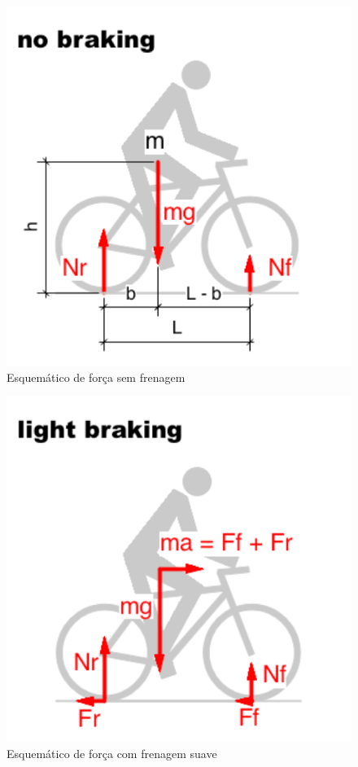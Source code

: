 		\graphicspath{{figuras/}}
		\begin{figure}[H]
		\centering
		\includegraphics[scale=0.80]{esq_forca_sem_frenagem.png}
		\caption{Esquemático de força sem frenagem}
		\label{img:esq_forca_sem_frenagem}
		\end{figure}

		\graphicspath{{figuras/}}
		\begin{figure}[h!]
		\centering
		\includegraphics[scale=0.80]{esq_forca_com_frenagem_suave.png}
		\caption{Esquemático de força com frenagem suave}
		\label{img:esq_forca_com_frenagem_suave}
		\end{figure}
		
